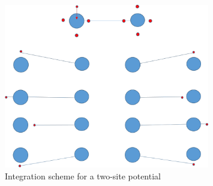 \documentclass{article}
\begin{document}
\begin{figure}
    \centering
    \includegraphics[width=0.8\textwidth]{Integration-points.png}
    \caption{Integration scheme for a two-site potential}
    \label{fig:integration-scheme}
\end{figure}



\end{document}
